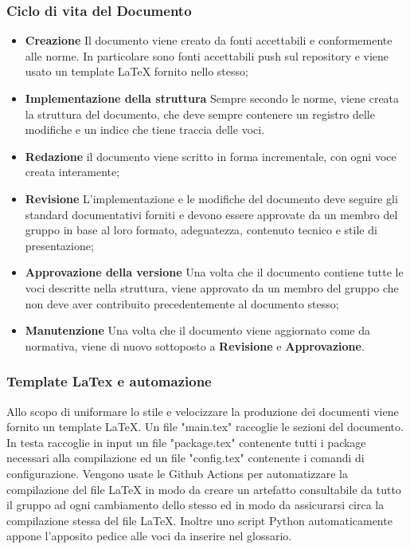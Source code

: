 	    \subsubsection{Ciclo di vita del Documento}
	    \begin{itemize}
	        \item \textbf{Creazione} Il documento viene creato da fonti accettabili e conformemente alle norme. In particolare sono fonti accettabili push sul repository e viene usato un template LaTeX fornito nello stesso;
	        \item \textbf{Implementazione della struttura} Sempre secondo le norme, viene creata la struttura del documento, che deve sempre contenere un registro delle modifiche e un indice che tiene traccia delle voci.
	        \item \textbf{Redazione} il documento viene scritto in forma incrementale, con ogni voce creata interamente;
	        \item \textbf{Revisione} L'implementazione e le modifiche del documento deve seguire gli standard documentativi forniti e devono essere approvate da un membro del gruppo in base al loro formato, adeguatezza, contenuto tecnico e stile di presentazione;
	        \item \textbf{Approvazione della versione} Una volta che il documento contiene tutte le voci descritte nella struttura, viene approvato da un membro del gruppo che non deve aver contribuito precedentemente al documento stesso;
	        \item \textbf{Manutenzione} Una volta che il documento viene aggiornato come da normativa, viene di nuovo sottoposto a \textbf{Revisione} e \textbf{Approvazione}.
	    \end{itemize}
    
    
    	
	    
	    \subsubsection{Template LaTex e automazione}
	    Allo scopo di uniformare lo stile e velocizzare la produzione dei documenti viene fornito un template LaTeX.
	    Un file "main.tex" raccoglie le sezioni del documento. In testa raccoglie in input un file "package.tex" contenente tutti i package necessari alla compilazione ed un file "config.tex" contenente i comandi di configurazione.
	    Vengono usate le Github Actions per automatizzare la compilazione del file LaTeX in modo da creare un artefatto consultabile da tutto il gruppo ad ogni cambiamento dello stesso ed in modo  da assicurarsi circa la compilazione stessa del file LaTeX. Inoltre uno script Python automaticamente appone l'apposito pedice alle voci da inserire nel glossario.
	    
